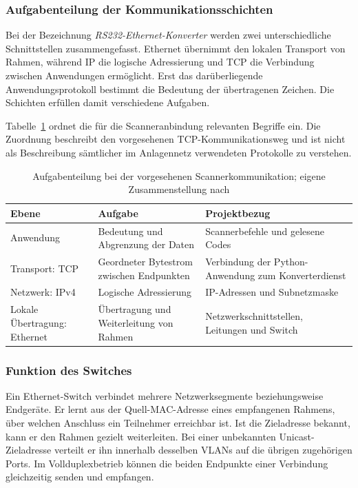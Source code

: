 \subsubsection{Aufgabenteilung der Kommunikationsschichten}

Bei der Bezeichnung \emph{RS232-Ethernet-Konverter} werden zwei unterschiedliche Schnittstellen zusammengefasst. Ethernet übernimmt den lokalen Transport von Rahmen, während IP die logische Adressierung und TCP die Verbindung zwischen Anwendungen ermöglicht. Erst das darüberliegende Anwendungsprotokoll bestimmt die Bedeutung der übertragenen Zeichen. Die Schichten erfüllen damit verschiedene Aufgaben. \cite[Abschn.~1.1.3]{rfc1122}

Tabelle~\ref{tab:grundlagen_schichten} ordnet die für die Scanneranbindung relevanten Begriffe ein. Die Zuordnung beschreibt den vorgesehenen TCP-Kommunikationsweg und ist nicht als Beschreibung sämtlicher im Anlagennetz verwendeten Protokolle zu verstehen.

\begin{table}[htbp]
  \centering
  \caption{Aufgabenteilung bei der vorgesehenen Scannerkommunikation; eigene Zusammenstellung nach \cite{rfc1122,rfc9293,cisco_switching}}
  \label{tab:grundlagen_schichten}
  \small
  \begin{tabular}{|p{}|p{}|p{}|}
    \hline
    \textbf{Ebene} & \textbf{Aufgabe} & \textbf{Projektbezug} \\ \hline
    Anwendung & Bedeutung und Abgrenzung der Daten & Scannerbefehle und gelesene Codes \\ \hline
    Transport: TCP & Geordneter Bytestrom zwischen Endpunkten & Verbindung der Python-Anwendung zum Konverterdienst \\ \hline
    Netzwerk: IPv4 & Logische Adressierung & IP-Adressen und Subnetzmaske \\ \hline
    Lokale Übertragung: Ethernet & Übertragung und Weiterleitung von Rahmen & Netzwerkschnittstellen, Leitungen und Switch \\ \hline
  \end{tabular}
\end{table}

\subsubsection{Funktion des Switches}

Ein Ethernet-Switch verbindet mehrere Netzwerksegmente beziehungsweise Endgeräte. Er lernt aus der Quell-MAC-Adresse eines empfangenen Rahmens, über welchen Anschluss ein Teilnehmer erreichbar ist. Ist die Zieladresse bekannt, kann er den Rahmen gezielt weiterleiten. Bei einer unbekannten Unicast-Zieladresse verteilt er ihn innerhalb desselben VLANs auf die übrigen zugehörigen Ports. Im Vollduplexbetrieb können die beiden Endpunkte einer Verbindung gleichzeitig senden und empfangen. \cite[Abschn.~Understanding Layer 2 Ethernet Switching]{cisco_switching}

